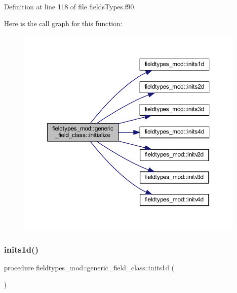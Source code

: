 Definition at line 118 of file fields\+Types.\+f90.

Here is the call graph for this function\+:\nopagebreak
\begin{figure}[H]
\begin{center}
\leavevmode
\includegraphics[width=350pt]{structfieldtypes__mod_1_1generic__field__class_a0fa61024cf22776788544cf848d767d7_cgraph}
\end{center}
\end{figure}
\mbox{\label{structfieldtypes__mod_1_1generic__field__class_a6a077022127f5450a2e77c034704ad2d}} 
\subsubsection{\texorpdfstring{inits1d()}{inits1d()}}
{\footnotesize\ttfamily procedure fieldtypes\+\_\+mod\+::generic\+\_\+field\+\_\+class\+::inits1d (\begin{DoxyParamCaption}{ }\end{DoxyParamCaption})\hspace{0.3cm}{\ttfamily [private]}}



